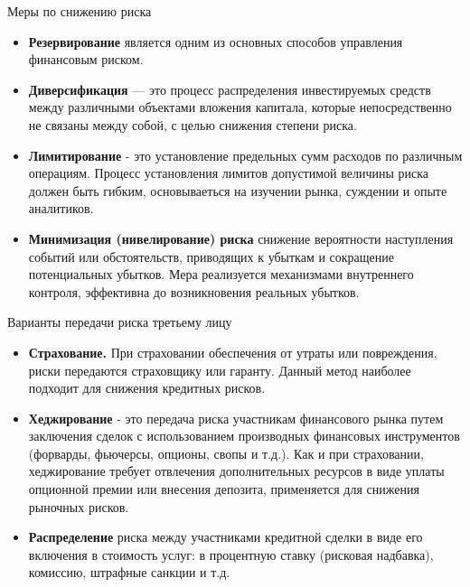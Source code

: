 \documentclass[_fin_decisions_lectures.tex]{subfiles}
\begin{document}
\begin{frame}[ allowframebreaks ]{Меры по снижению риска}
\begin{itemize}
\item
\textbf{Резервирование }является одним из основных способов управления финансовым риском. 
\pagebreak
\item
\textbf{Диверсификация }— это процесс распределения инвестируемых средств между различными объектами вложения капитала, которые непосредственно не связаны между собой, с целью снижения степени риска. 

\pagebreak
\item
\textbf{Лимитирование }- это установление предельных сумм расходов по различным операциям. Процесс установления лимитов допустимой величины риска должен быть гибким, основываеться на изучении рынка, суждении и опыте аналитиков.
\pagebreak
\item
\textbf{Минимизация (нивелирование) риска} снижение вероятности наступления событий или обстоятельств, приводящих к убыткам и сокращение потенциальных убытков. Мера реализуется механизмами внутреннего контроля, эффективна до возникновения реальных убытков.
\end{itemize}
\end{frame}

\begin{frame}[ allowframebreaks ]{Варианты передачи риска третьему лицу}
\begin{itemize}
\item
\textbf{Страхование. }При страховании обеспечения от утраты или повреждения, риски передаются страховщику или гаранту. Данный метод наиболее подходит для снижения кредитных рисков. 
\pagebreak
\item
\textbf{Хеджирование} - это передача риска участникам финансового рынка путем заключения сделок с использованием производных финансовых инструментов (форварды, фьючерсы, опционы, свопы и т.д.). Как и при страховании, хеджирование требует отвлечения дополнительных ресурсов в виде уплаты опционной премии или внесения депозита, применяется для снижения рыночных рисков.
\pagebreak
\item
\textbf{Распределение } риска между участниками кредитной сделки в виде его включения в стоимость услуг: в процентную ставку (рисковая надбавка), комиссию, штрафные санкции и т.д. 
\end{itemize}
\end{frame}
\end{document}
